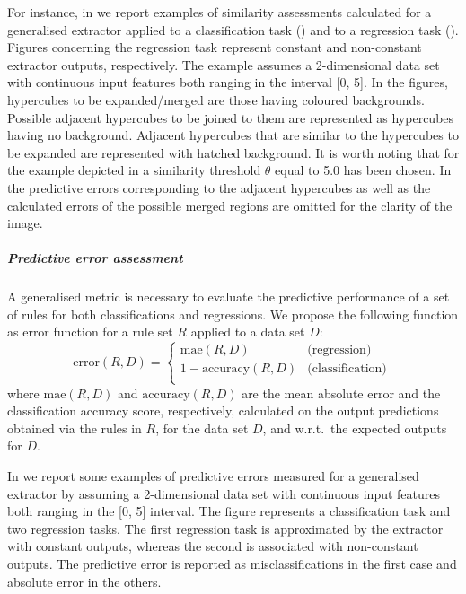 \documentclass[
]{ceurart}
\begin{document}


For instance, in  we report examples of similarity assessments calculated for a generalised extractor applied to a classification task () and to a regression task ().
%
Figures concerning the regression task represent constant and non-constant extractor outputs, respectively.
%
The example assumes a 2-dimensional data set with continuous input features both ranging in the interval [0, 5].
%
In the figures, hypercubes to be expanded/merged are those having coloured backgrounds.
%
Possible adjacent hypercubes to be joined to them are represented as hypercubes having no background.
%
Adjacent hypercubes that are similar to the hypercubes to be expanded are represented with hatched background.
%
It is worth noting that for the example depicted in  a similarity threshold $\theta$ equal to 5.0 has been chosen.
%
In  the predictive errors corresponding to the adjacent hypercubes as well as the calculated errors of the possible merged regions are omitted for the clarity of the image.

\subparagraph{Predictive error assessment}

A generalised metric is necessary to evaluate the predictive performance of a set of rules for both classifications and regressions.
%
We propose the following function as error function for a rule set $R$ applied to a data set $D$:
%
\begin{equation}\label{eq:error}
	\text{error}(R, D) = 
	\begin{cases}
		\text{mae}(R, D) & \text{(regression)}\\
		1 - \text{accuracy}(R, D) & \text{(classification)}\\
	\end{cases}\,
\end{equation}
%
where $\text{mae}(R, D)$ and $\text{accuracy}(R, D)$ are the mean absolute error and the classification accuracy score, respectively, calculated on the output predictions obtained via the rules in $R$, for the data set $D$, and w.r.t.\ the expected outputs for $D$.



In  we report some examples of predictive errors measured for a generalised extractor by assuming a 2-dimensional data set with continuous input features both ranging in the [0, 5] interval.
%
The figure represents a classification task and two regression tasks.
%
The first regression task is approximated by the extractor with constant outputs, whereas the second is associated with non-constant outputs.
%
The predictive error is reported as misclassifications in the first case and absolute error in the others.
 
\end{document}
